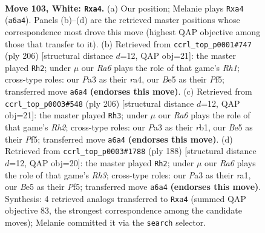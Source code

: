 \documentclass[11pt]{article}
\begin{document}
\clearpage

\begin{figure}[p]\centering
\begin{subfigure}{0.46\textwidth}\centering
\resizebox{\linewidth}{!}{%
\newchessgame
\chessboard[
  setfen={5r2/7k/R6P/4B3/p7/P7/6K1/8 w - - 3 103},
  showmover=false,
  pgfstyle=straightmove, color=movearrow, markmove={a6-a4}
]}
\caption{}
\end{subfigure}\hfill
\begin{subfigure}{0.46\textwidth}\centering
\resizebox{\linewidth}{!}{%
\newchessgame
\chessboard[
  setfen={8/5K1k/7P/5P2/r7/8/8/7R w - - 59 104},
  showmover=false,
  pgfstyle=straightmove, color=movearrow, markmove={h1-h2}
]}
\caption{}
\end{subfigure}
\\[4pt]
\begin{subfigure}{0.46\textwidth}\centering
\resizebox{\linewidth}{!}{%
\newchessgame
\chessboard[
  setfen={8/7k/3K3P/5P2/8/8/7R/1r6 w - - 65 104},
  showmover=false,
  pgfstyle=straightmove, color=movearrow, markmove={h2-h3}
]}
\caption{}
\end{subfigure}\hfill
\begin{subfigure}{0.46\textwidth}\centering
\resizebox{\linewidth}{!}{%
\newchessgame
\chessboard[
  setfen={8/7k/3K3P/5P2/8/7R/8/r7 w - - 71 95},
  showmover=false,
  pgfstyle=straightmove, color=movearrow, markmove={h3-h2}
]}
\caption{}
\end{subfigure}
\caption{\textbf{Move 103, White: \texttt{Rxa4}.} (a) Our position; Melanie plays \texttt{Rxa4} (\texttt{a6a4}). Panels (b)--(d) are the retrieved master positions whose correspondence most drove this move (highest QAP objective among those that transfer to it). (b) Retrieved from \texttt{ccrl\_top\_p0001\#747} (ply 206) [structural distance $d$=12, QAP obj=21]: the master played \texttt{Rh2}; under $\mu$ our \emph{Ra6} plays the role of that game's \emph{Rh1}; cross-type roles: our \emph{P}a3 as their \emph{r}a4, our \emph{B}e5 as their \emph{P}f5; transferred move \texttt{a6a4} \textbf{(endorses this move)}. (c) Retrieved from \texttt{ccrl\_top\_p0003\#548} (ply 206) [structural distance $d$=12, QAP obj=21]: the master played \texttt{Rh3}; under $\mu$ our \emph{Ra6} plays the role of that game's \emph{Rh2}; cross-type roles: our \emph{P}a3 as their \emph{r}b1, our \emph{B}e5 as their \emph{P}f5; transferred move \texttt{a6a4} \textbf{(endorses this move)}. (d) Retrieved from \texttt{ccrl\_top\_p0003\#1788} (ply 188) [structural distance $d$=12, QAP obj=20]: the master played \texttt{Rh2}; under $\mu$ our \emph{Ra6} plays the role of that game's \emph{Rh3}; cross-type roles: our \emph{P}a3 as their \emph{r}a1, our \emph{B}e5 as their \emph{P}f5; transferred move \texttt{a6a4} \textbf{(endorses this move)}. Synthesis: 4 retrieved analogs transferred to \texttt{Rxa4} (summed QAP objective 83, the strongest correspondence among the candidate moves); Melanie committed it via the \texttt{search} selector.}
\label{fig:thought-m204}
\end{figure}
\end{document}
